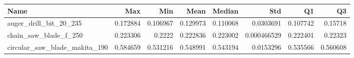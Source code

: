 \begin{tabular}{lrrrrrrr}
\hline
 Name                          &      Max &      Min &     Mean &   Median &         Std &       Q1 &       Q3 \\
\hline
 auger\_drill\_bit\_20\_235        & 0.172884 & 0.106967 & 0.129973 & 0.110068 & 0.0303691   & 0.107742 & 0.15718  \\
 chain\_saw\_blade\_f\_250         & 0.223306 & 0.2222   & 0.222836 & 0.223002 & 0.000466529 & 0.222401 & 0.22323  \\
 circular\_saw\_blade\_makita\_190 & 0.584659 & 0.531216 & 0.548991 & 0.543194 & 0.0153296   & 0.535566 & 0.560608 \\
\hline
\end{tabular}